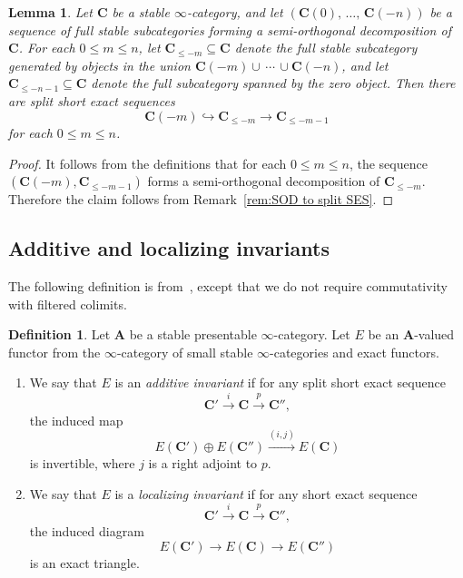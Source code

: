\documentclass[11pt]{article}
\newtheorem{lemm}[theo]{Lemma}
\theoremstyle{definition}
\newtheorem{defi}[theo]{Definition}
\numberwithin{equation}{section}
\numberwithin{figure}{section}
\numberwithin{table}{section}
\newcommand{\bA}{\ensuremath{\mathbf{A}}\xspace}
\newcommand{\bC}{\ensuremath{\mathbf{C}}\xspace}
\newcommand{\hook}{\hookrightarrow}
\renewcommand{\le}{\leqslant}
\newcommand*{\romanenumi}{\renewcommand*{\theenumi}{\roman{enumi}}}
\begin{document}
\begin{lemm}\label{lem:SOD filtration}
Let $\bC$ be a stable $\infty$-category, and let $(\bC(0),\,\ldots,\,\bC(-n))$ be a sequence of full stable subcategories forming a semi-orthogonal decomposition of $\bC$. For each $0 \le m \le n$, let $\bC_{\le -m} \subseteq \bC$ denote the full stable subcategory generated by objects in the union $\bC(-m)\cup\,\cdots\,\cup\bC(-n)$, and let $\bC_{\le -n-1} \subseteq \bC$ denote the full subcategory spanned by the zero object. Then there are split short exact sequences
\[
\bC(-m) \hook \bC_{\le -m} \to \bC_{\le -m-1}
\]
for each $0\le m\le n$.
\end{lemm}

\begin{proof}
It follows from the definitions that for each $0\le m\le n$, the sequence $(\bC(-m), \bC_{\le -m-1})$ forms a semi-orthogonal decomposition of $\bC_{\le -m}$. Therefore the claim follows from Remark~\ref{rem:SOD to split SES}.
\end{proof}

\subsection{Additive and localizing invariants}

The following definition is from~\cite{BlumbergGepnerTabuada}, except that we do not require commutativity with filtered colimits.

\begin{defi}\label{defn:additive invariant}
Let $\bA$ be a stable presentable $\infty$-category. Let $E$ be an $\bA$-valued functor from the $\infty$-category of small stable $\infty$-categories and exact functors.

\begin{enumerate}\romanenumi
\item We say that $E$ is an \emph{additive invariant} if for any split short exact sequence
\[
\bC' \xrightarrow{i} \bC \xrightarrow{p} \bC'',
\]
the induced map
\[
E(\bC') \oplus E(\bC'') \xrightarrow{(i,j)} E(\bC)
\]
is invertible, where $j$ is a right adjoint to $p$.
\item We say that $E$ is a \emph{localizing invariant} if for any short exact sequence
\[
\bC' \xrightarrow{i} \bC \xrightarrow{p} \bC'',
\]
the induced diagram
\[
E(\bC') \to E(\bC) \to E(\bC'')
\]
is an exact triangle.
\end{enumerate}
\end{defi}
\end{document}
